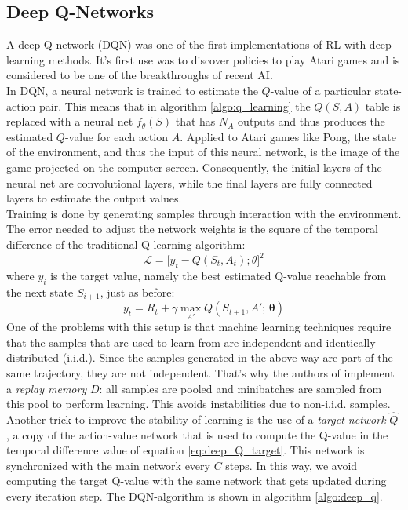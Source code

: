 \subsection{Deep Q-Networks}
\label{sec:deep_qn}
A deep Q-network (DQN) was one of the first implementations of RL with deep learning methods. It's first use was to discover policies to play Atari games \cite{mnih2013playing} and is considered to be one of the breakthroughs of recent AI.\\
In DQN, a neural network is trained to estimate the $Q$-value of a particular state-action pair. This means that in algorithm \ref{algo:q_learning} the $Q(S,A)$ table is replaced with a neural net $f_{\theta}(S)$ that has $N_A$ outputs and thus  produces the estimated $Q$-value for each action $A$. Applied to Atari games like Pong, the state of the environment, and thus the input of this neural network, is the image of the game projected on the computer screen. Consequently, the initial layers of the neural net are convolutional layers, while the final layers are fully connected layers to estimate the output values.\\
Training is done by generating samples through interaction with the environment. The error needed to adjust the network weights is the square of the temporal difference of the traditional Q-learning algorithm:
\begin{equation}
\mathcal{L} = \big [y_t - Q(S_t, A_t); \theta \big ]^2
\label{eq:deep_Q_update}
\end{equation}
where $y_i$ is the target value, namely the best estimated Q-value reachable from the next state $S_{i+1}$, just as before:
\begin{equation}
y_t = R_t + \gamma \max_{A'} Q(S_{t+1}, A';\, \bm{\theta})
\label{eq:deep_Q_target}
\end{equation}
One of the problems with this setup is that machine learning techniques require that the samples that are used to learn from are independent and identically distributed (i.i.d.). Since the samples generated in the above way are part of the same trajectory, they are not independent. That's why the authors of \cite{mnih2015human} implement a \emph{replay memory} $D$: all samples are pooled and minibatches are sampled from this pool to perform learning. This avoids instabilities due to non-i.i.d. samples.\\
Another trick to improve the stability of learning is the use of a \emph{target network}  $\hat{Q}$ \cite{mnih2015human}, a copy of the action-value network that is used to compute the Q-value in the temporal difference value of equation \ref{eq:deep_Q_target}. This network is synchronized with the main network every $C$ steps. In this way, we avoid computing the target Q-value with the same network that gets updated during every iteration step. The DQN-algorithm is shown in algorithm \ref{algo:deep_q}. \\

